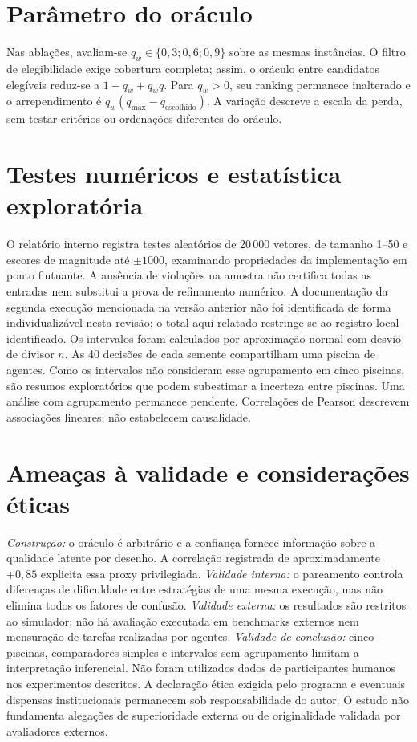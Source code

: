 \section{Parâmetro do oráculo}
Nas ablações, avaliam-se $q_w\in\{0{,}3;0{,}6;0{,}9\}$ sobre as mesmas instâncias. O filtro de elegibilidade exige cobertura completa; assim, o oráculo entre candidatos elegíveis reduz-se a $1-q_w+q_wq$. Para $q_w>0$, seu ranking permanece inalterado e o arrependimento é $q_w(q_{\max}-q_{\mathrm{escolhido}})$. A variação descreve a escala da perda, sem testar critérios ou ordenações diferentes do oráculo.
\section{Testes numéricos e estatística exploratória}
O relatório interno registra testes aleatórios de 20\,000 vetores, de tamanho 1--50 e escores de magnitude até $\pm1000$, examinando propriedades da implementação em ponto flutuante. A ausência de violações na amostra não certifica todas as entradas nem substitui a prova de refinamento numérico. A documentação da segunda execução mencionada na versão anterior não foi identificada de forma individualizável nesta revisão; o total aqui relatado restringe-se ao registro local identificado.
Os intervalos foram calculados por aproximação normal com desvio de divisor $n$. As 40 decisões de cada semente compartilham uma piscina de agentes. Como os intervalos não consideram esse agrupamento em cinco piscinas, são resumos exploratórios que podem subestimar a incerteza entre piscinas. Uma análise com agrupamento permanece pendente. Correlações de Pearson descrevem associações lineares; não estabelecem causalidade.
\section{Ameaças à validade e considerações éticas}
\textit{Construção:} o oráculo é arbitrário e a confiança fornece informação sobre a qualidade latente por desenho. A correlação registrada de aproximadamente $+0{,}85$ explicita essa proxy privilegiada. \textit{Validade interna:} o pareamento controla diferenças de dificuldade entre estratégias de uma mesma execução, mas não elimina todos os fatores de confusão. \textit{Validade externa:} os resultados são restritos ao simulador; não há avaliação executada em benchmarks externos nem mensuração de tarefas realizadas por agentes. \textit{Validade de conclusão:} cinco piscinas, comparadores simples e intervalos sem agrupamento limitam a interpretação inferencial.
Não foram utilizados dados de participantes humanos nos experimentos descritos. A declaração ética exigida pelo programa e eventuais dispensas institucionais permanecem sob responsabilidade do autor. O estudo não fundamenta alegações de superioridade externa ou de originalidade validada por avaliadores externos.

